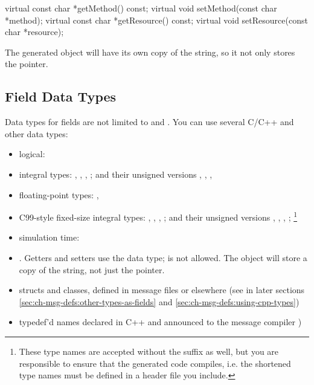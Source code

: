 \begin{cpp}
virtual const char *getMethod() const;
virtual void setMethod(const char *method);
virtual const char *getResource() const;
virtual void setResource(const char *resource);
\end{cpp}

The generated object will have its own copy of the string, so it not only stores
the  pointer.


\subsection{Field Data Types}
\label{sec:ch-msg-defs:field-data-types}

Data types for fields are not limited to  and
. You can use several C/C++ and other data types:

\begin{itemize}
   \item logical: 
   \item integral types: , , ,
      ; and their unsigned versions ,
      , , 
   \item floating-point types: , 
   \item C99-style fixed-size integral types: , ,
      , ; and their unsigned versions
      , , , ;
      \footnote{These type names are accepted without the  suffix as well,
      but you are responsible to ensure that the generated code compiles, i.e. the
      shortened type names must be defined in a header file you include.}
   \item {\opp} simulation time: 
   \item {}. Getters and setters use the  data type;
       is not allowed. The object will store a copy of the string,
      not just the pointer.
   \item structs and classes, defined in message files or elsewhere (see
      in later sections \ref{sec:ch-msg-defs:other-types-as-fields}
      and \ref{sec:ch-msg-defs:using-cpp-types})
   \item typedef'd names declared in C++ and announced to the message compiler
)
\end{itemize}


